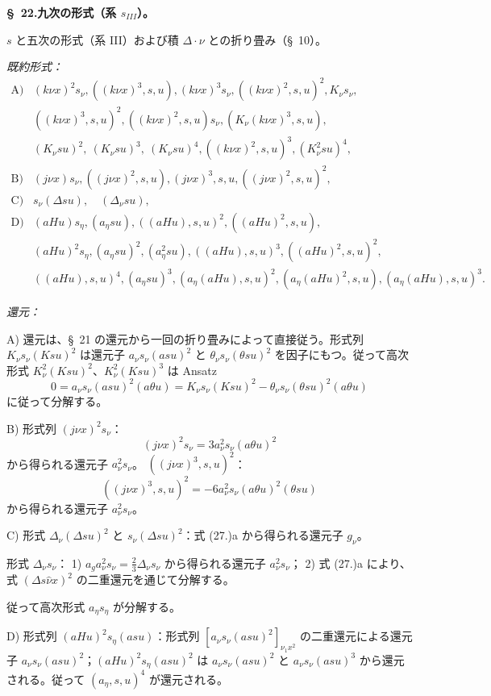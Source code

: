 \documentclass[11pt]{jlreq}
\newcommand{\A}{\Delta}
\begin{document}
\begin{center}
\textbf{\S\ 22.\quad 九次の形式（系 $s_{III}$）。}
\end{center}

$s$ と五次の形式（系 III）および積 $\A\cdot\nu$ との折り畳み（\S\ 10）。

\noindent\emph{既約形式：}
\[
\begin{array}{ll}
\text{A)}& (k\nu x)^2s_\nu,
((k\nu x)^3,s,u),
(k\nu x)^3s_\nu,
((k\nu x)^2,s,u)^2,
K_\nu s_\nu,\\
& ((k\nu x)^3,s,u)^2,
((k\nu x)^2,s,u)s_\nu,
(K_\nu(k\nu x)^3,s,u),\\
& (K_\nu su)^2,\ (K_\nu su)^3,\ (K_\nu su)^4,
((k\nu x)^2,s,u)^3,
(K_\nu^2su)^4,\\[0.3em]
\text{B)}& (j\nu x)s_\nu,
((j\nu x)^2,s,u),
(j\nu x)^3,s,u,
((j\nu x)^2,s,u)^2,\\[0.3em]
\text{C)}& s_\nu(\A su),\quad (\A_\nu su),\\[0.3em]
\text{D)}& (aHu)s_\eta,
(a_\eta su),
((aHu),s,u)^2,
((aHu)^2,s,u),\\
& (aHu)^2s_\eta,
(a_\eta su)^2,
(a_\eta^2su),
((aHu),s,u)^3,
((aHu)^2,s,u)^2,\\
& ((aHu),s,u)^4,
(a_\eta su)^3,
(a_\eta(aHu),s,u)^2,
(a_\eta(aHu)^2,s,u),
(a_\eta(aHu),s,u)^3.
\end{array}
\]

\noindent\emph{還元：}

A) 還元は、\S\ 21 の還元から一回の折り畳みによって直接従う。形式列 $K_\nu s_\nu(Ksu)^2$ は還元子 $a_\nu s_\nu(asu)^2$ と $\theta_\nu s_\nu(\theta su)^2$ を因子にもつ。従って高次形式 $K_\nu^2(Ksu)^2$、$K_\nu^2(Ksu)^3$ は Ansatz
\[
0=a_\nu s_\nu(asu)^2(a\theta u)=K_\nu s_\nu(Ksu)^2-\theta_\nu s_\nu(\theta su)^2(a\theta u)
\]
に従って分解する。

B) 形式列 $(j\nu x)^2s_\nu$：
\[
(j\nu x)^2s_\nu=3a_\nu^2s_\nu(a\theta u)^2
\]
から得られる還元子 $a_\nu^2s_\nu$。
$((j\nu x)^3,s,u)^2$：
\[
((j\nu x)^3,s,u)^2=-6a_\nu^2s_\nu(a\theta u)^2(\theta su)
\]
から得られる還元子 $a_\nu^2s_\nu$。

C) 形式 $\A_\nu(\A su)^2$ と $s_\nu(\A su)^2$：式 (27.)a から得られる還元子 $g_\nu$。

形式 $\A_\nu s_\nu$：
1) $a_g a_\nu^2s_\nu=\frac23\A_\nu s_\nu$ から得られる還元子 $a_\nu^2s_\nu$；
2) 式 (27.)a により、式 $(\A s\widehat\nu x)^2$ の二重還元を通じて分解する。

従って高次形式 $a_\eta s_\eta$ が分解する。

D) 形式列 $(aHu)^2s_\eta(asu)$：形式列 $[a_\nu s_\nu(asu)^2]_{\nu_1x^2}$ の二重還元による還元子 $a_\nu s_\nu(asu)^2$；$(aHu)^2s_\eta(asu)^2$ は $a_\nu s_\nu(asu)^2$ と $a_\nu s_\nu(asu)^3$ から還元される。従って $(a_\eta,s,u)^4$ が還元される。
\end{document}
